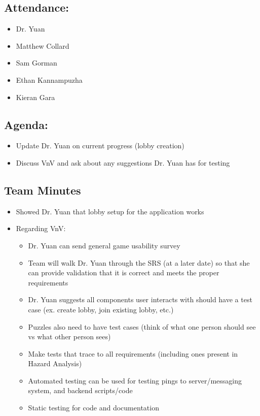 \documentclass{article}
\begin{document}
\subsection*{Attendance:}
\begin{itemize}
    \item Dr. Yuan
    \item Matthew Collard
    \item Sam Gorman
    \item Ethan Kannampuzha
    \item Kieran Gara
\end{itemize}

\subsection*{Agenda:}
\begin{itemize}
    \item Update Dr. Yuan on current progress (lobby creation)
    \item Discuss VnV and ask about any suggestions Dr. Yuan has for testing
\end{itemize}

\subsection*{Team Minutes}

\begin{itemize}
    \item Showed Dr. Yuan that lobby setup for the application works   
    \item Regarding VnV:
    \begin{itemize}
        \item Dr. Yuan can send general game usability survey
        \item Team will walk Dr. Yuan through the SRS (at a later date) so that she can provide validation that it is correct and meets the proper requirements
        \item Dr. Yuan suggests all components user interacts with should have a test case (ex. create lobby, join existing lobby, etc.)
        \item Puzzles also need to have test cases (think of what one person should see vs what other person sees)
        \item Make tests that trace to all requirements (including ones present in Hazard Analysis)
        \item Automated testing can be used for testing pings to server/messaging system, and backend 
        scripts/code
        \item Static testing for code and documentation
    \end{itemize}
    
\end{itemize}
\end{document}
